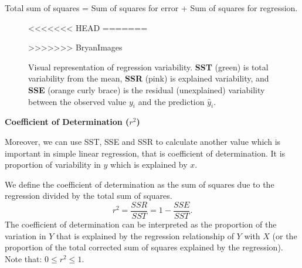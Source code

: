 Total sum of squares = Sum of squares for error + Sum of squares for regression.

\begin{figure}[H]
\begin{center}
<<<<<<< HEAD
=======
\end{center}
>>>>>>> BryanImages
\caption{Visual representation of regression variability. \textbf{SST} (green) is total variability from the mean, \textbf{SSR} (pink) is explained variability, and \textbf{SSE} (orange curly brace) is the residual (unexplained) variability between the observed value $y_i$ and the prediction $\hat{y}_i$.}
\end{figure}

\textbf{Coefficient of Determination ($r^2$)}

Moreover, we can use SST, SSE and SSR to calculate another value which is important in simple linear regression, that is coefficient of determination. It is proportion of variability in $y$ which is explained by $x$.

\begin{definition}
We define the coefficient of determination as the sum of squares due to the regression divided by the total sum of squares. $$r^2 = \frac{SSR}{SST} = 1 - \frac{SSE}{SST}.$$
The coefficient of determination can be interpreted as the proportion of the variation in $Y$ that is explained by the regression relationship of $Y$ with $X$ (or the proportion of the total corrected sum of squares explained by the regression). Note that: $0 \leq r^2 \leq 1.$

\end{definition}




